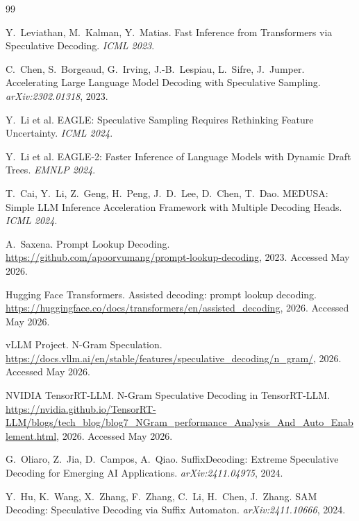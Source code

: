 \documentclass[11pt,a4paper]{article}
\begin{document}

\begin{thebibliography}{99}

Y.~Leviathan, M.~Kalman, Y.~Matias.
\newblock Fast Inference from Transformers via Speculative Decoding.
\newblock \emph{ICML 2023}.

C.~Chen, S.~Borgeaud, G.~Irving, J.-B.~Lespiau, L.~Sifre, J.~Jumper.
\newblock Accelerating Large Language Model Decoding with Speculative Sampling.
\newblock \emph{arXiv:2302.01318}, 2023.

Y.~Li et al.
\newblock EAGLE: Speculative Sampling Requires Rethinking Feature Uncertainty.
\newblock \emph{ICML 2024}.

Y.~Li et al.
\newblock EAGLE-2: Faster Inference of Language Models with Dynamic Draft Trees.
\newblock \emph{EMNLP 2024}.

T.~Cai, Y.~Li, Z.~Geng, H.~Peng, J.~D.~Lee, D.~Chen, T.~Dao.
\newblock MEDUSA: Simple LLM Inference Acceleration Framework with Multiple Decoding Heads.
\newblock \emph{ICML 2024}.

A.~Saxena.
\newblock Prompt Lookup Decoding.
\newblock \url{https://github.com/apoorvumang/prompt-lookup-decoding}, 2023.
Accessed May 2026.

Hugging Face Transformers.
\newblock Assisted decoding: prompt lookup decoding.
\newblock \url{https://huggingface.co/docs/transformers/en/assisted_decoding}, 2026.
Accessed May 2026.

vLLM Project.
\newblock N-Gram Speculation.
\newblock \url{https://docs.vllm.ai/en/stable/features/speculative_decoding/n_gram/}, 2026.
Accessed May 2026.

NVIDIA TensorRT-LLM.
\newblock N-Gram Speculative Decoding in TensorRT-LLM.
\newblock \url{https://nvidia.github.io/TensorRT-LLM/blogs/tech_blog/blog7_NGram_performance_Analysis_And_Auto_Enablement.html}, 2026.
Accessed May 2026.

G.~Oliaro, Z.~Jia, D.~Campos, A.~Qiao.
\newblock SuffixDecoding: Extreme Speculative Decoding for Emerging AI Applications.
\newblock \emph{arXiv:2411.04975}, 2024.

Y.~Hu, K.~Wang, X.~Zhang, F.~Zhang, C.~Li, H.~Chen, J.~Zhang.
\newblock SAM Decoding: Speculative Decoding via Suffix Automaton.
\newblock \emph{arXiv:2411.10666}, 2024.


\end{thebibliography}
\end{document}
